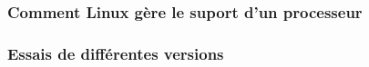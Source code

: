 \subsubsection{Comment Linux gère le suport d'un processeur}

\subsubsection{Essais de différentes versions}